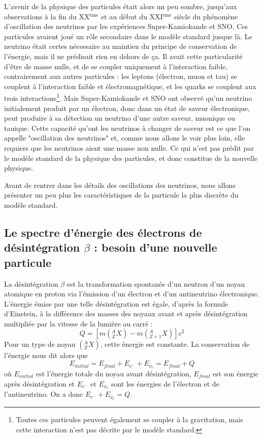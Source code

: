 		    L'avenir de la physique des particules était alors un peu sombre, jusqu'aux observations à la fin du XX$^{\text{ème}}$ et au début du XXI$^{\text{ème}}$ siècle du phénomène d'oscillation des neutrinos par les expériences Super-Kamiokande\cite{Fukuda1998} et SNO\cite{Aharmim2013}. Ces particules avaient joué un rôle secondaire dans le modèle standard jusque là. Le neutrino était certes nécessaire au maintien du principe de conservation de l'énergie, mais il ne prédisait rien en dehors de ça. Il avait cette particularité d'être de masse nulle, et de se coupler uniquement à l'interaction faible, contrairement aux autres particules : les leptons (électron, muon et tau) se couplent à l'interaction faible et électromagnétique, et les quarks se couplent aux trois interactions\footnote{Toutes ces particules peuvent également se coupler à la gravitation, mais cette interaction n'est pas décrite par le modèle standard.}. Mais Super-Kamiokande et SNO ont observé qu'un neutrino initialement produit par un électron, donc dans un état de saveur électronique, peut produire à sa détection un neutrino d'une autre saveur, muonique ou tauique. Cette capacité qu'ont les neutrinos à changer de saveur est ce que l'on appelle "oscillation des neutrinos" et, comme nous allons le voir plus loin, elle requiers que les neutrinos aient une masse non nulle. Ce qui n'est pas prédit par le modèle standard de la physique des particules, et donc constitue de la nouvelle physique.
		    
		    Avant de rentrer dans les détails des oscillations des neutrinos, nous allons présenter un peu plus les caractéristiques de la particule la plus discrète du modèle standard.
		    		    
    
        \subsection{Le spectre d'énergie des électrons de désintégration \texorpdfstring{$\beta$}{b} : besoin d'une nouvelle particule}\label{sec::neutrino_origin}
        
	        La désintégration $\beta$ est la transformation spontanée d'un neutron d'un noyau atomique en proton via l'émission d'un électron et d'un antineutrino électronique. L'énergie émise par une telle désintégration est égale, d'après la formule d'Einstein, à la différence des masses des noyaux avant et après désintégration multipliée par la vitesse de la lumière au carré : 
	        \begin{equation}
	        	Q = \left[m\left(^A_Z X\right)-m\left(^A_{Z+1} X\right)\right]c^2
	        \end{equation}
	        Pour un type de noyau $\left(^A_Z X\right)$, cette énergie est constante. La conservation de l'énergie nous dit alors que
	        \begin{equation}
	        	E_{initial} = E_{final} +E_{e^-}+E_{\overline{\nu}_e} = E_{final}+Q
	        \end{equation}
	        où $E_{initial}$ est l'énergie totale du noyau avant désintégration, $E_{final}$ est son énergie après désintégration et $E_{e^-}$ et $E_{\overline{\nu}_e}$ sont les énergies de l'électron et de l'antineutrino. On a donc $E_{e^-}+E_{\overline{\nu}_e} = Q$.
	        
